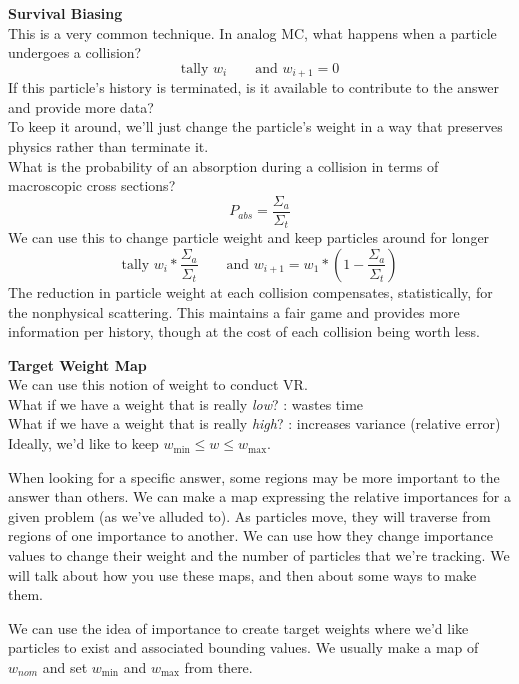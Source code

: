 \documentclass[12pt]{article}
\begin{document}
\textbf{Survival Biasing}\\
This is a very common technique. In analog MC, what happens when a particle undergoes a collision?
\[
\text{tally }w_i \qquad \text{and } w_{i+1} = 0
\]
If this particle's history is terminated, is it available to contribute to the answer and provide more data?\\
To keep it around, we'll just change the particle's weight in a way that preserves physics rather than terminate it. \\
What is the probability of an absorption during a collision in terms of macroscopic cross sections?
\[
P_{abs} = \frac{\Sigma_a}{\Sigma_t}
\]
We can use this to change particle weight and keep particles around for longer
\[
\text{tally }w_i*\frac{\Sigma_a}{\Sigma_t} \qquad \text{and } w_{i+1} = w_1*(1 - \frac{\Sigma_a}{\Sigma_t})
\]
The reduction in particle weight at each collision compensates, statistically, for the nonphysical scattering. This maintains a fair game and provides more information per history, though at the cost of each collision being worth less.

\textbf{Target Weight Map}\\
We can use this notion of weight to conduct VR. \\
What if we have a weight that is really \textit{low}? : wastes time\\
What if we have a weight that is really \textit{high}? : increases variance (relative error)\\
Ideally, we'd like to keep $w_{\min} \leq w \leq w_{\max}$.

When looking for a specific answer, some regions may be more important to the answer than others. We can make a map expressing the relative importances for a given problem (as we've alluded to). As particles move, they will traverse from regions of one importance to another. We can use how they change importance values to change their weight and the number of particles that we're tracking. We will talk about how you use these maps, and then about some ways to make them.

We can use the idea of importance to create target weights where we'd like particles to exist and associated bounding values. We usually make a map of $w_{nom}$ and set $w_{\min}$ and $w_{\max}$ from there. 
\end{document}
